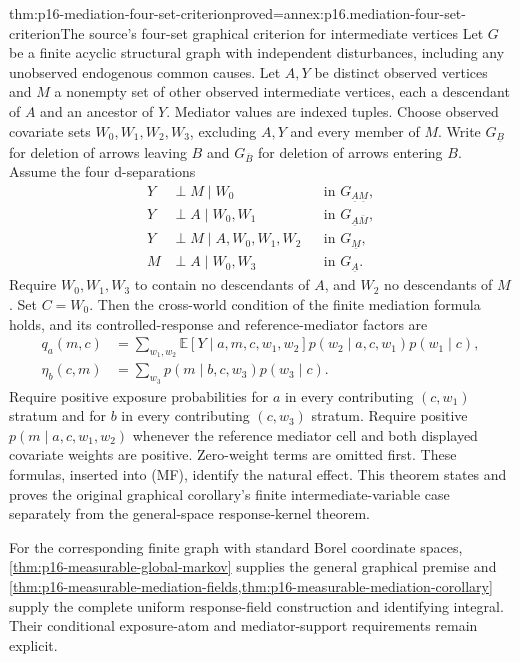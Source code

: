 \begin{hbtheorem}{thm:p16-mediation-four-set-criterion}{proved=annex:p16.mediation-four-set-criterion}{The source's four-set graphical criterion for intermediate vertices}
Let \(G\) be a finite acyclic structural graph with independent
disturbances, including any unobserved endogenous common causes.
Let \(A,Y\) be distinct observed vertices and \(M\) a nonempty set of
other observed intermediate vertices, each a descendant of \(A\) and an ancestor
of \(Y\). Mediator values are indexed tuples. Choose observed covariate sets
\(W_0,W_1,W_2,W_3\), excluding \(A,Y\) and every member of \(M\). Write
\(G_{\underline B}\) for deletion of arrows leaving \(B\) and
\(G_{\overline B}\) for deletion of arrows entering \(B\).
Assume the four d-separations
\[
\begin{aligned}
 Y&\perp M\mid W_0 &&\text{in }G_{\underline A\underline M},\\
 Y&\perp A\mid W_0,W_1 &&\text{in }G_{\underline A\overline M},\\
 Y&\perp M\mid A,W_0,W_1,W_2 &&\text{in }G_{\underline M},\\
 M&\perp A\mid W_0,W_3 &&\text{in }G_{\underline A}.
\end{aligned}
\]
Require \(W_0,W_1,W_3\) to contain no descendants of \(A\), and
\(W_2\) no descendants of \(M\). Set \(C=W_0\). Then the
cross-world condition of the finite mediation formula holds, and its
controlled-response and reference-mediator factors are
\[
\begin{aligned}
 q_a(m,c)&=\sum_{w_1,w_2}\mathbb E[Y\mid a,m,c,w_1,w_2]
             p(w_2\mid a,c,w_1)p(w_1\mid c),\\
 \eta_b(c,m)&=\sum_{w_3}p(m\mid b,c,w_3)p(w_3\mid c).
\end{aligned}
\]
Require positive exposure probabilities for \(a\) in every contributing
\((c,w_1)\) stratum and for \(b\) in every contributing \((c,w_3)\)
stratum. Require positive \(p(m\mid a,c,w_1,w_2)\) whenever the
reference mediator cell and both displayed covariate weights are positive.
Zero-weight terms are omitted first. These formulas, inserted into (MF),
identify the natural effect. This theorem states and proves the original
graphical corollary's finite intermediate-variable case separately from the
general-space response-kernel theorem.
\end{hbtheorem}

For the corresponding finite graph with standard Borel coordinate spaces,
\cref{thm:p16-measurable-global-markov} supplies the general graphical
premise and \cref{thm:p16-measurable-mediation-fields,thm:p16-measurable-mediation-corollary} supply the complete uniform
response-field construction and identifying integral. Their conditional
exposure-atom and mediator-support requirements remain explicit.

